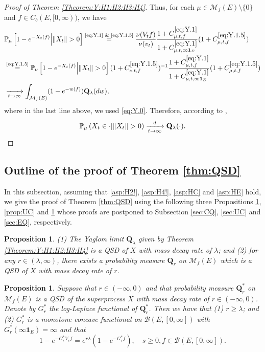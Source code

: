 \documentclass[12pt,a4paper]{amsart}
\numberwithin{equation}{section}
\theoremstyle{plain}
\newtheorem{prop}[thm]{Proposition}
\theoremstyle{definition}
\theoremstyle{remark}
\begin{document}
\begin{proof}[Proof of Theorem \ref{Theorem:Y:H1:H2:H3:H4}]
	Thus, for each $\mu \in \mathcal M_f(E)\setminus \{0\}$ and $f\in C_b(E,[0,\infty))$, we have
\begin{align}
&\mathbb P_\mu \left[1 - e^{-X_t(f)} \middle|\|X_t\|>0\right]
	 \overset{\text{\eqref{eq:Y.1} \& \eqref{eq:Y.1.5}}}= \frac{ \nu(V_tf) }{ \nu(v_t) } \frac{1+C^{\eqref{eq:Y.1}}_{\mu,t,f}}{1+C^{\eqref{eq:Y.1}}_{\mu, t,\infty \mathbf 1_E}}(1+ C^{\eqref{eq:Y.1.5}}_{\mu,t,f})
	\\& \overset{\text{\eqref{eq:Y.1.5}}}= \mathbb P_\nu \left[1 - e^{-X_t(f)} \middle| \|X_t\|>0\right](1+C^{\eqref{eq:Y.1.5}}_{\nu, t,f})^{-1}  \frac{1+C^{\eqref{eq:Y.1}}_{\mu,t,f}}{1+C^{\eqref{eq:Y.1}}_{\mu,  t,\infty \mathbf 1_E}}(1+ C^{\eqref{eq:Y.1.5}}_{\mu,t,f})
	\\&\xrightarrow[t\to \infty]{} \int_{\mathcal M_f(E)}(1-e^{-w(f)}) \mathbf Q_\lambda(dw),
\end{align}
	where in the last line above, we used \eqref{eq:Y.0}. 
	Therefore, according to \cite[Theorem 1.18]{Li2011MeasureValued},
	\[\mathbb P_\mu\left(X_t \in \cdot \middle| \|X_t\|>0\right) \xrightarrow[t\to \infty]{d} \mathbf Q_\lambda(\cdot). \qedhere\]
\end{proof}

\subsection{Outline of the proof of Theorem \ref{thm:QSD}}

	In this subsection, assuming that \eqref{asp:H2!}, \eqref{asp:H4!}, \eqref{asp:HC} and \eqref{asp:HE} hold, we give the proof of Theorem \ref{thm:QSD} using the following three Propositions \ref{prop:CQ}, \ref{prop:UC} and \ref{prop:EQ} whose proofs are postponed to Subsection \ref{sec:CQ}, \ref{sec:UC} and \ref{sec:EQ}, respectively.

\begin{prop} \label{prop:EQ}
	(1) The Yaglom limit $\mathbf Q_\lambda$ given by Theorem \ref{Theorem:Y:H1:H2:H3:H4} is a QSD of $X$ with mass decay rate of $\lambda$; and
	(2) for any $r \in (\lambda , \infty)$, there exists a probability measure $\mathbf Q_r$  on $\mathcal M_f(E)$ which is a QSD of $X$ with mass decay rate of $r$.
\end{prop}


\begin{prop} \label{prop:CQ}
	Suppose that $r \in (-\infty, 0)$ and that probability measure $\mathbf Q^*_{r}$ on $\mathcal M_f(E)$ is a QSD of the superprocess $X$ with mass decay rate of $r \in (-\infty, 0)$. Denote by $G^*_r$ the log-Laplace functional of $\mathbf Q^*_r$.
	Then we have that (1) $r \geq \lambda$; and (2) $G^*_r$ is a monotone concave functional on $\mathcal B(E,[0,\infty])$ with $G^*_r(\infty \mathbf 1_E) = \infty$ and that
	\[
	1 - e^{-G^*_r V_s f} = e^{r\lambda }(1- e^{- G^*_r f}), \quad s\geq 0, f\in \mathcal B(E,[0,\infty]).
	\] 
\end{prop}
\end{document}

